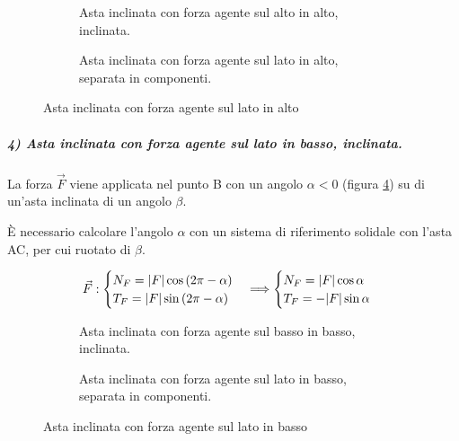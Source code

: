 \documentclass[main.tex]{subfiles}
\begin{document}
\begin{figure}[!tbp]
  \begin{subfigure}[b]{.5\textwidth}
  \centering
  \resizebox{.5\textwidth}{!}{}
  \caption{Asta inclinata con forza agente sul alto in alto, inclinata.}
  \label{asta_inclinata_forza_inclinata_alto_intera}
  \end{subfigure}
  \hfill
  \begin{subfigure}[b]{.5\textwidth}
  \centering
  \resizebox{.5\textwidth}{!}{}
  \caption{Asta inclinata con forza agente sul lato in alto, separata in componenti.}
  \label{asta_inclinata_forza_inclinata_alto_separata}
  \end{subfigure}
  \caption{Asta inclinata con forza agente sul lato in alto}
  \label{asta_inclinata_forza_inclinata_alto}
\end{figure}

\subparagraph{4) Asta inclinata con forza agente sul lato in basso, inclinata.}
La forza $\vec{F}$ viene applicata nel punto B con un angolo $\alpha<0$ (figura \ref{asta_inclinata_forza_inclinata_basso_intera}) su di un'asta inclinata di un angolo $\beta$.

È necessario calcolare l'angolo $\alpha$ con un sistema di riferimento solidale con l'asta AC, per cui ruotato di $\beta$.

\[
  \vec{F}: \begin{cases}
    N_F = \lvert F\rvert\cos{(2\pi-\alpha)}\\
    T_F = \lvert F\rvert\sin{(2\pi-\alpha)}
  \end{cases}
  \Longrightarrow
	\begin{cases}
		N_F = \lvert F\rvert\cos{\alpha}\\
		T_F = -\lvert F\rvert\sin{\alpha}
	\end{cases}
\]


\begin{figure}[!tbp]
  \begin{subfigure}[b]{.5\textwidth}
  \centering
  \resizebox{.5\textwidth}{!}{}
  \caption{Asta inclinata con forza agente sul basso in basso, inclinata.}
  \label{asta_inclinata_forza_inclinata_basso_intera}
  \end{subfigure}
  \hfill
  \begin{subfigure}[b]{.5\textwidth}
  \centering
  \resizebox{.5\textwidth}{!}{}
  \caption{Asta inclinata con forza agente sul lato in basso, separata in componenti.}
  \label{asta_inclinata_forza_inclinata_basso_separata}
  \end{subfigure}
  \caption{Asta inclinata con forza agente sul lato in basso}
  \label{asta_inclinata_forza_inclinata_basso}
\end{figure}
\end{document}
